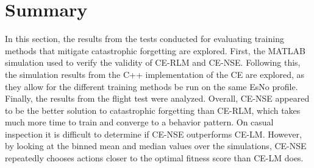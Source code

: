 \section{Summary}
\par In this section, the results from the tests conducted for evaluating training methods that mitigate catastrophic forgetting are explored. First, the MATLAB simulation used to verify the validity of CE-RLM and CE-NSE. Following this, the simulation results from the C++ implementation of the CE are explored, as they allow for the different training methods be run on the same EsNo profile. Finally, the results from the flight test were analyzed. Overall, CE-NSE appeared to be the better solution to catastrophic forgetting than CE-RLM, which takes much more time to train and converge to a behavior pattern. On casual inspection it is difficult to determine if CE-NSE outperforms CE-LM. However, by looking at the binned mean and median values over the simulations, CE-NSE repeatedly chooses actions closer to the optimal fitness score than CE-LM does.
